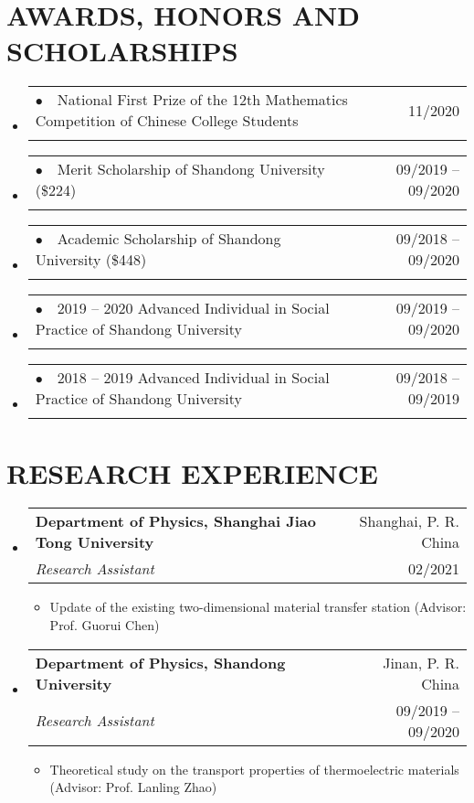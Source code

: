 \documentclass[letterpaper,11pt]{article}
\makeatletter
\newcommand{\resumeItem}[1]{
  \item\small{
    {#1 \vspace{-2pt}}
  }
}
\newcommand{\resumeSubheading}[4]{
  \item
    \begin{tabular*}{1.0\textwidth}[t]{l@{\extracolsep{\fill}}r}
      \textbf{#1} & {\small #2} \\
      {\small#3} & {\small #4} \\
    \end{tabular*}
}
\newcommand{\resumeSubhhheading}[4]{
  \item
    \begin{tabular*}{1.0\textwidth}[t]{l@{\extracolsep{\fill}}r}
      {#1} & {\small #2} \\
      {\small#3} & {\small #4} \\
    \end{tabular*}
}
\newcommand{\resumeSubHeadingListStart}{\begin{itemize}[leftmargin=0.0in, label={}]}
\newcommand{\resumeSubHeadingListEnd}{\end{itemize}}
\newcommand{\resumeItemListStart}{\begin{itemize}}
\newcommand{\resumeItemListEnd}{\end{itemize}\vspace{-5pt}}
\makeatother
\begin{document}
  
\section{AWARDS, HONORS AND SCHOLARSHIPS}
    \resumeSubHeadingListStart
        \resumeSubhhheading
              {$\bullet$~~National First Prize of the 12th Mathematics Competition of Chinese College Students}{11/2020}{}{}
                     \resumeSubHeadingListEnd  \vspace{-1.5cm}
                  \resumeSubHeadingListStart
    \resumeSubhhheading
          {$\bullet$~~Merit Scholarship of Shandong University (\$224)}{09/2019 – 09/2020}{}{}
                     \resumeSubHeadingListEnd  
                     \vspace{-1.5cm}
                                        \resumeSubHeadingListStart
    \resumeSubhhheading
                {$\bullet$~~Academic Scholarship of Shandong University (\$448)}{09/2018 – 09/2020}{}{}
                                     \resumeSubHeadingListEnd  \vspace{-1.5cm}
                  \resumeSubHeadingListStart
    \resumeSubhhheading
                {$\bullet$~~2019 – 2020 Advanced Individual in Social Practice of Shandong University}{09/2019 – 09/2020}{}{}
                     \resumeSubHeadingListEnd  \vspace{-1.5cm}
                  \resumeSubHeadingListStart
    \resumeSubhhheading
                {$\bullet$~~2018 – 2019 Advanced Individual in Social Practice of Shandong University}{09/2018 – 09/2019}{}{}
                                     \resumeSubHeadingListEnd
%                                     
         \vspace{-1.2cm}                            
\section{RESEARCH EXPERIENCE}
      \resumeSubHeadingListStart
    \resumeSubheading
      {Department of Physics, Shanghai Jiao Tong University}{Shanghai, P. R. China}{\textit{Research Assistant}}{02/2021}
            \resumeItemListStart
        \resumeItem{Update of the existing two-dimensional material transfer station (Advisor: Prof. Guorui Chen)}
                    \resumeItemListEnd
                        \resumeSubHeadingListEnd
           \resumeSubHeadingListStart
    \resumeSubheading
      {Department of Physics, Shandong University}{Jinan, P. R. China}{\textit{Research Assistant}}{09/2019 – 09/2020}
            \resumeItemListStart
        \resumeItem{Theoretical study on the transport properties of thermoelectric materials (Advisor: Prof. Lanling Zhao)}
                    \resumeItemListEnd
                        \resumeSubHeadingListEnd   
                       
\end{document}
